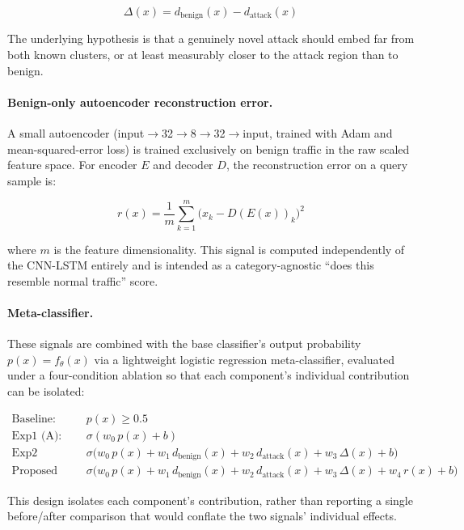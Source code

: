 \documentclass[11pt]{article}
\begin{document}
\begin{equation}
\Delta(x) = d_{\text{benign}}(x) - d_{\text{attack}}(x)
\end{equation}

The underlying hypothesis is that a genuinely novel attack should embed far from both known
clusters, or at least measurably closer to the attack region than to benign.

\paragraph{Benign-only autoencoder reconstruction error.} A small autoencoder
(input$\to$32$\to$8$\to$32$\to$input, trained with Adam and mean-squared-error loss) is trained
exclusively on benign traffic in the raw scaled feature space. For encoder $E$ and decoder $D$, the
reconstruction error on a query sample is:

\begin{equation}
r(x) = \frac{1}{m} \sum_{k=1}^{m} \big(x_k - D(E(x))_k\big)^2
\end{equation}

where $m$ is the feature dimensionality. This signal is computed independently of the CNN-LSTM
entirely and is intended as a category-agnostic ``does this resemble normal traffic'' score.

\paragraph{Meta-classifier.} These signals are combined with the base classifier's output
probability $p(x) = f_\theta(x)$ via a lightweight logistic regression meta-classifier, evaluated
under a four-condition ablation so that each component's individual contribution can be isolated:

\begin{align}
\text{Baseline:} \quad & p(x) \ge 0.5 \\
\text{Exp1 (A):} \quad & \sigma(w_0 \, p(x) + b) \\
\text{Exp2 (A+B):} \quad & \sigma\big(w_0 \, p(x) + w_1 \, d_{\text{benign}}(x) + w_2 \, d_{\text{attack}}(x) + w_3 \, \Delta(x) + b\big) \\
\text{Proposed (A+B+C):} \quad & \sigma\big(w_0 \, p(x) + w_1 \, d_{\text{benign}}(x) + w_2 \, d_{\text{attack}}(x) + w_3 \, \Delta(x) + w_4 \, r(x) + b\big)
\end{align}

This design isolates each component's contribution, rather than reporting a single before/after
comparison that would conflate the two signals' individual effects.
\end{document}
